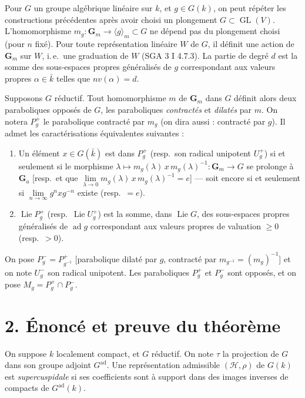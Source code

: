\documentclass[10pt,a4paper]{amsart}
\theoremstyle{plain}
\theoremstyle{remark}
\DeclareMathOperator{\Lie}{Lie}
\DeclareMathOperator{\ad}{ad}
\DeclareMathOperator{\GL}{GL}
\begin{document}
Pour $G$ un groupe algébrique linéaire sur $k$, et $g \in G(k)$, on peut répéter les
constructions précédentes après avoir choisi un plongement $G \subset \GL(V)$.
L'homomorphisme $m_g : \mathbf{G}_m \to \langle g \rangle_m \subset G$ ne dépend pas du
plongement choisi (pour $n$ fixé). Pour toute représentation linéaire $W$ de $G$, il définit
une action de $\mathbf{G}_m$ sur $W$, i.\,e.\ une graduation de $W$ (SGA 3 I 4.7.3). La partie
de degré $d$ est la somme des sous-espaces propres généralisés de $g$ correspondant aux
valeurs propres $\alpha \in \bar{k}$ telles que $nv(\alpha) = d$.

Supposons $G$ réductif. Tout homomorphisme $m$ de $\mathbf{G}_m$ dans $G$ définit alors
deux paraboliques opposés de $G$, les paraboliques \textit{contractés} et \textit{dilatés} par $m$.
On notera $P_g^+$ le parabolique contracté par $m_g$ (on dira aussi : contracté par $g$).
Il admet les caractérisations équivalentes suivantes :

\begin{enumerate}
\item[(a)] Un élément $x \in G(\bar{k})$ est dans $P_g^+$ (resp.\ son radical unipotent $U_g^+$)
si et seulement si le morphisme $\lambda \mapsto m_g(\lambda)\, x\, m_g(\lambda)^{-1} : \mathbf{G}_m \to G$
se prolonge à $\mathbf{G}_a$ [resp.\ et que $\lim\limits_{\lambda \to 0} m_g(\lambda)\, x\, m_g(\lambda)^{-1} = e$]
--- soit encore si et seulement si $\lim\limits_{n \to \infty} g^n x g^{-n}$ existe
(resp.\ $= e$).

\item[(b)] $\Lie P_g^+$ (resp.\ $\Lie U_g^+$) est la somme, dans $\Lie G$, des sous-espaces
propres généralisés de $\ad g$ correspondant aux valeurs propres de valuation $\ge 0$
(resp.\ $> 0$).
\end{enumerate}

On pose $P_g^- = P_{g^{-1}}^+$ [parabolique dilaté par $g$, contracté par $m_{g^{-1}} = (m_g)^{-1}$]
et on note $U_g^-$ son radical unipotent. Les paraboliques $P_g^+$ et $P_g^-$ sont opposés,
et on pose $M_g = P_g^+ \cap P_g^-$.

\section*{2. Énoncé et preuve du théorème}

On suppose $k$ localement compact, et $G$ réductif. On note $\tau$ la projection de $G$
dans son groupe adjoint $G^{\mathrm{ad}}$. Une représentation admissible $(\mathscr{H}, \rho)$ de $G(k)$
est \textit{supercuspidale} si ses coefficients sont à support dans des images inverses de
compacts de $G^{\mathrm{ad}}(k)$.
\end{document}
